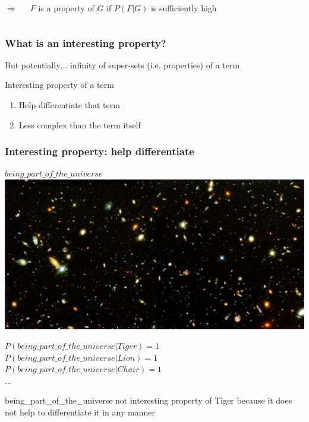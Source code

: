 \documentclass{beamer}
\begin{document}
{\begin{columns}
     \pause

     \column{0.2in}

     $\Rightarrow$

     \column{2in}

     \begin{beamerboxesrounded}{$F$ is a \alert{property} of $G$ if}
       \alert{$P(F|G)$} is sufficiently \alert{high}
     \end{beamerboxesrounded}

   \end{columns}
}

\frame
{
  \frametitle{What is an \alert{interesting} property?}

  But potentially$\ldots$
  \alert{infinity of super-sets} (i.e. properties) of a term\\[5ex]

  \begin{beamerboxesrounded}{Interesting property of a term}
    \begin{enumerate}
    \item Help \alert{differentiate} that term
    \item \alert{Less complex} than the term itself
    \end{enumerate}
  \end{beamerboxesrounded}
}

\frame
{
  \frametitle{Interesting property: help \alert{differentiate}}

  \alert{$being\_part\_of\_the\_universe$}\\
  \includegraphics[scale=0.12]{universe.jpg}

  $P(being\_part\_of\_the\_universe|Tiger)=1$\\
  $P(being\_part\_of\_the\_universe|Lion)=1$\\
  $P(being\_part\_of\_the\_universe|Chair)=1$\\
  $\ldots$\\

  \pause

  \begin{beamerboxesrounded}{being\_part\_of\_the\_universe
      \alert{not interesting property} of Tiger}
    because it does not help to differentiate it in any manner
  \end{beamerboxesrounded}
}
\end{document}
